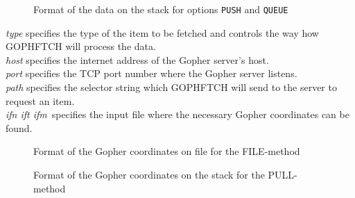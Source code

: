 \begin{figure}
\caption{Format of the data on the stack for options
{\tt PUSH} and {\tt QUEUE}} \label{stack.format}
\begin{center}
\end{center}
\end{figure}

\noindent
{\sl type} specifies the type of the item to be fetched and controls
the way how GOPHFTCH will process the data.\\
{\sl host} specifies the internet address of the Gopher server's host.\\
{\sl port} specifies the TCP port number where the Gopher server listens.\\
{\sl path} specifies the selector string which GOPHFTCH will send to
the server to request an item.\\
{\sl ifn ift ifm}\ specifies the input file where the necessary Gopher
coordinates can be found.

\begin{figure}
\caption{Format of the Gopher coordinates on file for the FILE-method}
\begin{center}\end{center}
\end{figure}

\begin{figure}
\caption{Format of the Gopher coordinates on the stack for the PULL-method}
\begin{center}\end{center}
\end{figure}

